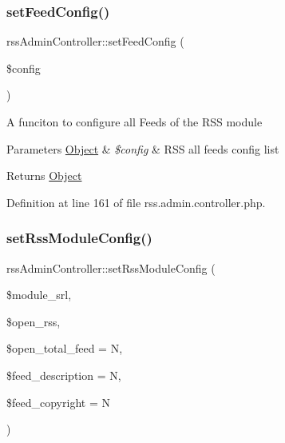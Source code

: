 \mbox{\label{classrssAdminController_a57c67e2413e7d6491f090975531094cd}} 
\subsubsection{\texorpdfstring{set\+Feed\+Config()}{setFeedConfig()}}
{\footnotesize\ttfamily rss\+Admin\+Controller\+::set\+Feed\+Config (\begin{DoxyParamCaption}\item[{}]{\$config }\end{DoxyParamCaption})}

A funciton to configure all Feeds of the R\+SS module


\begin{DoxyParams}[1]{Parameters}
\hyperlink{classObject}{Object} & {\em \$config} & R\+SS all feeds config list \\
\hline
\end{DoxyParams}
\begin{DoxyReturn}{Returns}
\hyperlink{classObject}{Object} 
\end{DoxyReturn}


Definition at line 161 of file rss.\+admin.\+controller.\+php.

\mbox{\label{classrssAdminController_ac4be2f74cc3b47f20d96b45c7ec5b619}} 
\subsubsection{\texorpdfstring{set\+Rss\+Module\+Config()}{setRssModuleConfig()}}
{\footnotesize\ttfamily rss\+Admin\+Controller\+::set\+Rss\+Module\+Config (\begin{DoxyParamCaption}\item[{}]{\$module\+\_\+srl,  }\item[{}]{\$open\+\_\+rss,  }\item[{}]{\$open\+\_\+total\+\_\+feed = {\ttfamily \textquotesingle{}N\textquotesingle{}},  }\item[{}]{\$feed\+\_\+description = {\ttfamily \textquotesingle{}N\textquotesingle{}},  }\item[{}]{\$feed\+\_\+copyright = {\ttfamily \textquotesingle{}N\textquotesingle{}} }\end{DoxyParamCaption})}

